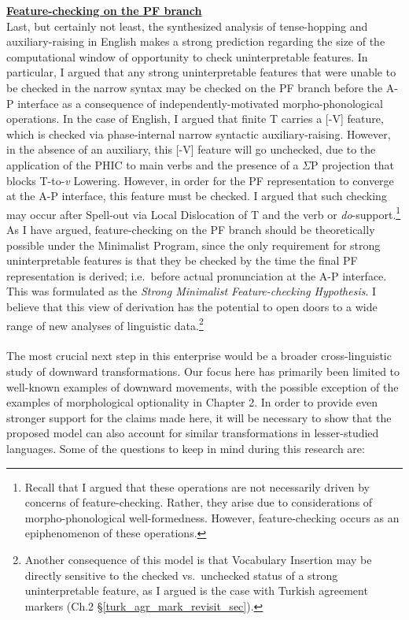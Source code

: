 \underline{\textbf{Feature-checking on the PF branch}}\\Last, but certainly not least, the synthesized analysis of tense-hopping and auxiliary-raising in English makes a strong prediction regarding the size of the computational window of opportunity to check uninterpretable features. In particular, I argued that any strong uninterpretable features that were unable to be checked in the narrow syntax may be checked on the PF branch before the A-P interface as a consequence of independently-motivated morpho-phonological operations. In the case of English, I argued that finite T carries a [-V] feature, which is checked via phase-internal narrow syntactic auxiliary-raising. However, in the absence of an auxiliary, this [-V] feature will go unchecked, due to the application of the PHIC to main verbs and the presence of a $\Sigma$P projection that blocks T-to-{\it v} Lowering. However, in order for the PF representation to converge at the A-P interface, this feature must be checked. I argued that such checking may occur after Spell-out via Local Dislocation of T and the verb or {\it do}-support.\footnote{Recall that I argued that these operations are not necessarily driven by concerns of feature-checking. Rather, they arise due to considerations of morpho-phonological well-formedness. However, feature-checking occurs as an epiphenomenon of these operations.} As I have argued, feature-checking on the PF branch should be theoretically possible under the Minimalist Program, since the only requirement for strong uninterpretable features is that they be checked by the time the final PF representation is derived; i.e.\ before actual pronunciation at the A-P interface. This was formulated as the {\it Strong Minimalist Feature-checking Hypothesis}. I believe that this view of derivation has the potential to open doors to a wide range of new analyses of linguistic data.\footnote{Another consequence of this model is that Vocabulary Insertion may be directly sensitive to the checked vs.\ unchecked status of a strong uninterpretable feature, as I argued is the case with Turkish agreement markers (Ch.2 \S\ref{turk_agr_mark_revisit_sec}).}\\\\

The most crucial next step in this enterprise would be a broader cross-linguistic study of downward transformations. Our focus here has primarily been limited to well-known examples of downward movements, with the possible exception of the examples of morphological optionality in Chapter 2. In order to provide even stronger support for the claims made here, it will be necessary to show that the proposed model can also account for similar transformations in lesser-studied languages. Some of the questions to keep in mind during this research are:

